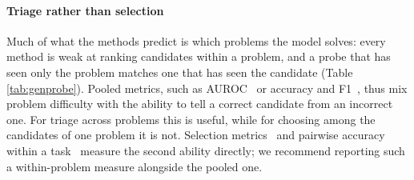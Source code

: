 
\paragraph{Triage rather than selection}
Much of what the methods predict is which problems
the model solves: every method is weak at ranking candidates within a problem, and a probe that has seen only the problem matches one that has seen the candidate (Table \ref{tab:genprobe}). Pooled metrics,  such as AUROC~\cite{bouchard2026functional, shi2026codemorethantext} or accuracy and F1~\cite{bui2025openia, Vu2026Autoprobe}, thus mix problem difficulty with the ability to tell a correct candidate from an incorrect one. 
For triage across problems this is useful, while for choosing among
the candidates of one problem it is not. Selection metrics~\cite{ribeiro2026repe} and pairwise
accuracy within a task~\cite{ribeiro2026robustness} measure the second ability
directly; we recommend reporting such a within-problem measure alongside the
pooled one. 

